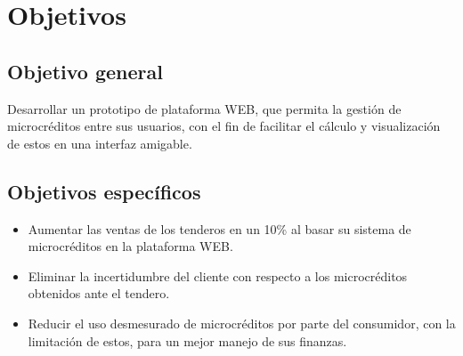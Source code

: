 \section{Objetivos}

	\subsection{Objetivo general}
	
	{Desarrollar un prototipo de plataforma WEB, que permita la gestión de microcréditos entre sus usuarios, con el fin de facilitar el cálculo y visualización de estos en una interfaz amigable.}
	
	\subsection{Objetivos específicos}
	
	\begin{itemize}
		\renewcommand{\labelitemi}{$\bullet$}
		\item Aumentar las ventas de los tenderos en un 10\% al basar su sistema de microcréditos en la plataforma WEB.
		\item Eliminar la incertidumbre del cliente con respecto a los microcréditos obtenidos ante el tendero.
		\item Reducir el uso desmesurado de microcréditos por parte del consumidor, con la limitación de estos, para un mejor manejo de sus finanzas.
	\end{itemize}
	
	
	
	
	
	